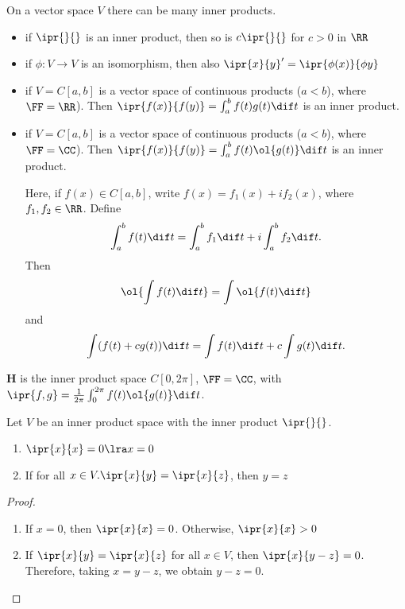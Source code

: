 \documentclass[11pt]{scrartcl}
\begin{document}
\begin{remark}
On a vector space $V$ there can be many inner products.
\end{remark}
\begin{example}
  \hfill
\begin{itemize}
\item if $\ipr{\*}{\*}$ is an inner product, then so is $c\ipr{\*}{\*}$ for $c>0$ in $\RR$
\item if $\phi:V\to V$ is an isomorphism, then also $\ipr{x}{y}'=\ipr{\phi(x)}{\phi{y}}$
\item if $V = C[a,b]$ is a vector space of continuous products
  ($a<b$), where $\FF = \RR$). Then $\ipr{f(x)}{f(y)} = \int_a^bf(t)g(t)\dif t$ is an inner product.
\item if $V = C[a,b]$ is a vector space of continuous products
  ($a<b$), where $\FF = \CC$). Then
  $\ipr{f(x)}{f(y)} = \int_a^bf(t)\ol{g(t)}\dif t$ is an inner
  product.

  Here, if $f(x) \in C[a,b]$, write $f(x) = f_1(x) + i f_2(x)$, where
  $f_1, f_2\in \RR$. Define
  \[\int_a^bf(t)\dif t = \int_a^bf_1 \dif t + i\int_a^bf_2 \dif t.\] Then
  \[\ol{\int f(t) \dif t} = \int \ol{f(t) \dif t }\] and
  \[\int(f(t)+cg(t))\dif t = \int f(t)\dif t + c \int g(t) \dif t.\]
\end{itemize}
\end{example}

\begin{definition}
  \hfill

  \textbf{H} is the inner product space $C[0,2\pi]$, $\FF = \CC$, with
  $\ipr{f, g} = \frac{1}{2\pi}\int_0^{2\pi}f(t)\ol{g(t)}\dif t$.
\end{definition}

\begin{theorem}
  Let $V$ be an inner product space with the inner product $\ipr{\*}{\*}$.

  \begin{enumerate}[label=\alph*)]
  \item $\ipr{x}{x} = 0 \lra x = 0$
  \item If for all $x\in V.\ipr{x}{y} = \ipr{x}{z}$, then $y = z$
  \end{enumerate}

\end{theorem}
\begin{proof}
  \hfill

  \begin{enumerate}[label=\alph*)]
  \item If $x = 0$, then $\ipr{x}{x} = 0$. Otherwise, $\ipr{x}{x}>0$
  \item If $\ipr{x}{y} = \ipr{x}{z}$ for all $x\in V$, then
    $\ipr{x}{y-z} = 0$. Therefore, taking $x = y-z$, we obtain $y - z =0$.
  \end{enumerate}
\end{proof}
\end{document}
